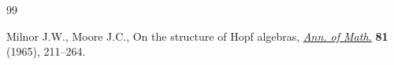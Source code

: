 \begin{thebibliography}{99}

Milnor J.W., Moore J.C., On the structure of {H}opf algebras, \href{https://doi.org/10.2307/1970615}{\textit{Ann. of
 Math.}} \textbf{81} (1965), 211--264.

\end{thebibliography}
